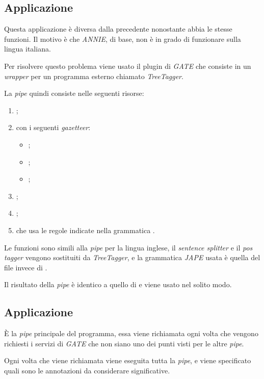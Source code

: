 \documentclass[tesi.tex]{subfiles}
\begin{document}
\subsection{Applicazione }
Questa applicazione \`e diversa dalla precedente nonostante abbia le
stesse funzioni. Il motivo \`e che \emph{ANNIE}, di base, non \`e in grado di funzionare
sulla lingua italiana.

Per risolvere questo problema viene usato il plugin di \emph{GATE} 
che consiste in un \emph{wrapper} per un programma esterno chiamato
\emph{TreeTagger}.

La \emph{pipe} quindi consiste nelle seguenti risorse:
\begin{enumerate}
\item {};
\item {} con i seguenti \emph{gazetteer}:
  \begin{itemize}
  \item {};
  \item {};
  \item {};
  \end{itemize}
\item {}; 
\item {};
\item {} che usa le regole indicate nella
  grammatica .
\end{enumerate}

Le funzioni sono simili alla \emph{pipe} per la lingua inglese, il
\emph{sentence splitter} e il \emph{pos tagger} vengono sostituiti da
\emph{TreeTagger}, e la grammatica \emph{JAPE} usata \`e quella del
file  invece di .

Il risultato della \emph{pipe} \`e identico a quello di
 e viene usato nel solito modo.

\subsection{Applicazione }
\`E la \emph{pipe} principale del programma, essa viene richiamata
ogni volta che vengono richiesti i servizi di \emph{GATE} che non
siano uno dei punti visti per le altre \emph{pipe}.

Ogni volta che viene richiamata viene eseguita tutta la \emph{pipe},
e viene specificato quali sono le annotazioni da considerare
significative.
\end{document}
